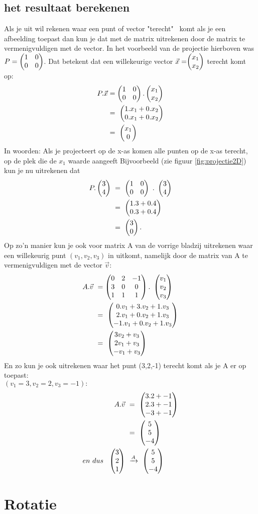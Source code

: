 \subsection{het resultaat berekenen}
Als je uit wil rekenen waar een punt of vector "terecht" \ komt als je een afbeelding toepast dan kun je dat met de matrix uitrekenen door de matrix te vermenigvuldigen met de vector. In het voorbeeld van de projectie hierboven was $ P = \begin{pmatrix} 1&0 \\ 0&0 \end{pmatrix} $. Dat betekent dat een willekeurige vector $ \vec{x} =  \vectweesnel{x} $  terecht komt op: 
\begin{align*}
P.\vec{x} 
&= \begin{pmatrix} 1&0 \\ 0&0 \end{pmatrix}   .
\begin{pmatrix} x_1 \\ x_2 \end{pmatrix} \\
&= \ \begin{pmatrix} 1.x_1 + 0.x_2 \\ 0.x_1 + 0.x_2 \end{pmatrix}  \\
& = \ \begin{pmatrix} x_1 \\ 0 \end{pmatrix}  
\end{align*}
In woorden: Als je projecteert op de x-as komen alle punten  op de x-as terecht, op de plek die de $ x_1 $ waarde aangeeft Bijvoorbeeld (zie figuur \ref{fig:projectie2D}) kun je nu uitrekenen dat
\begin{align*}
P . \mattwee{3}{4}  \ 
&= \ \mattwee{1&0}{0&0}  \ . \   \mattwee{3}{4}  \\
&=  \ \mattwee{1.3 + 0.4}{0.3 + 0.4} \\
&= \ \mattwee{3}{0}.  
\end{align*}
Op zo'n manier kun je ook voor  matrix A van de vorrige bladzij uitrekenen waar een willekeurig punt $ (v_1, v_2, v_3)  $ in \RD uitkomt, namelijk door de matrix van A te vermenigvuldigen met de vector $ \vec{v} $:
\begin{align*}
A.\vec{v} \ 
&= \matdrie{0&2&-1}{3&0&0}{1&1&1}  
. \ \matdrie{v_1}{v_2}{v_3}   \\
&= \ \matdrie{0.v_1 + 3.v_2 + 1.v_3}{2.v_1 + 0.v_2+ 1.v_3}{-1.v_1 + 0.v_2 + 1.v_3}  \\
&= \ \matdrie{3v_2 + v_3}{2v_1 +  v_3}{-v_1 +  v_3} 
\end{align*}
En zo kun je ook  uitrekenen waar het punt (3,2,-1) terecht komt als je A er op toepast: \\
$ (v_1 = 3, v_2 = 2 ,  v_3=-1 ):  $ 
\begin{align*}
\quad \ A.\vec{v} \ 
&= \ \matdrie{3.2 + -1}{2.3+  -1}{-3 +  -1} \\
&= \  \matdrie{5}{5}{-4} \\
en \ dus \ \ 
\matdrie{3}{2}{1}  \ & \xrightarrow{A}  \   \matdrie{5}{5}{-4}
\end{align*}
\section{Rotatie}		
\label{rotatie}

